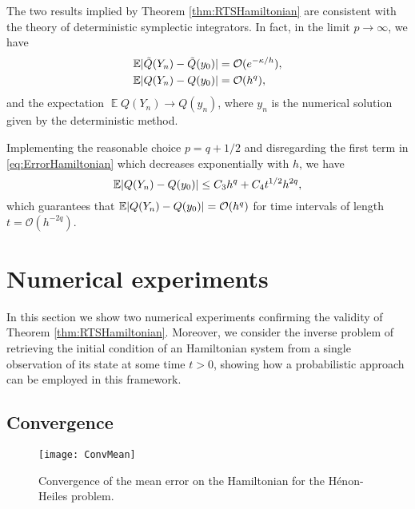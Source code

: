 \documentclass{siamart1116}
\numberwithin{theorem}{section}
\DeclarePairedDelimiter{\abs}{\lvert}{\rvert}
\newcommand{\OO}{\mathcal{O}}
\newcommand{\E}{\operatorname{\mathbb{E}}}
\begin{document}
\begin{remark} The two results implied by Theorem \ref{thm:RTSHamiltonian} are consistent with the theory of deterministic symplectic integrators. In fact, in the limit $p \to \infty$, we have
	\begin{align}
		\E \abs{\tilde Q(Y_n) - \tilde Q(y_0)} &= \OO(e^{-\kappa/h}), \\
		\E \abs{Q(Y_n) - Q(y_0)} &= \OO(h^q),
	\end{align}
	and the expectation $\E Q(Y_n) \to Q(y_n)$, where $y_n$ is the numerical solution given by the deterministic method.
\end{remark}
\begin{remark} Implementing the reasonable choice $p = q + 1/2$ and disregarding the first term in \eqref{eq:ErrorHamiltonian} which decreases exponentially with $h$, we have
\begin{equation}
	\E\abs{Q(Y_n) - Q(y_0)} \leq C_3 h^q + C_4t^{1/2}h^{2q},
\end{equation} 
which guarantees that $\E\abs{Q(Y_n) - Q(y_0)} = \OO(h^q)$ for time intervals of length $t = \OO(h^{-2q})$.
\end{remark}

\section{Numerical experiments}\label{sec:NUMEXP}
In this section we show two numerical experiments confirming the validity of Theorem \ref{thm:RTSHamiltonian}. Moreover, we consider the inverse problem of retrieving the initial condition of an Hamiltonian system from a single observation of its state at some time $t > 0$, showing how a probabilistic approach can be employed in this framework.

\subsection{Convergence} 
\begin{figure}[t!]
	\centering
	\texttt{[image: ConvMean]}
	\caption{Convergence of the mean error on the Hamiltonian for the Hénon-Heiles problem.}
	\label{fig:Mean}	
\end{figure}
\end{document}
